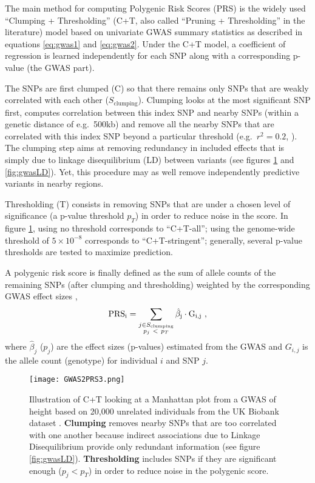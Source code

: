 The main method for computing Polygenic Risk Scores (PRS) is the widely used ``Clumping + Thresholding'' (C+T, also called ``Pruning + Thresholding'' in the literature) model based on univariate GWAS summary statistics as described in equations \eqref{eq:gwas1} and \eqref{eq:gwas2}.
Under the C+T model, a coefficient of regression is learned independently for each SNP along with a corresponding p-value (the GWAS part). 

The SNPs are first clumped (C) so that there remains only SNPs that are weakly correlated with each other ($S_\text{clumping}$). Clumping looks at the most significant SNP first, computes correlation between this index SNP and nearby SNPs (within a genetic distance of e.g.\ 500kb) and remove all the nearby SNPs that are correlated with this index SNP beyond a particular threshold (e.g.\ $r^2 = 0.2$, \cite{wray2014research}). 
The clumping step aims at removing redundancy in included effects that is simply due to linkage disequilibrium (LD) between variants (see figures \ref{fig:gwas2} and \ref{fig:gwasLD}). Yet, this procedure may as well remove independently predictive variants in nearby regions.

Thresholding (T) consists in removing SNPs that are under a chosen level of significance (a p-value threshold $p_T$) in order to reduce noise in the score.
In figure \ref{fig:gwas2}, using no threshold corresponds to ``C+T-all''; using the genome-wide threshold of $5 \times 10^{-8}$ corresponds to ``C+T-stringent''; generally, several p-value thresholds are tested to maximize prediction. 

A polygenic risk score is finally defined as the sum of allele counts of the remaining SNPs (after clumping and thresholding) weighted by the corresponding GWAS effect sizes \cite[]{purcell2009common,Dudbridge2013,wray2014research,Euesden2015},
\[\rm{PRS}_i = \sum_{\substack{j \in S_\text{clumping} \\ p_j~<~p_T}} \hat\beta_j \cdot G_{i,j}~,\] where $\hat\beta_j$ ($p_j$) are the effect sizes (p-values) estimated from the GWAS and $G_{i,j}$ is the allele count (genotype) for individual $i$ and SNP $j$.

\begin{figure}[htb]
\centerline{\texttt{[image: GWAS2PRS3.png]}}
\caption{Illustration of C+T looking at a Manhattan plot from a GWAS of height based on 20,000 unrelated individuals from the UK Biobank dataset \cite[]{bycroft2017genome}. \textbf{\color{clumping}Clumping} removes nearby SNPs that are too correlated with one another because indirect associations due to Linkage Disequilibrium provide only redundant information (see figure \ref{fig:gwasLD}). \textbf{\color{thresholding}Thresholding} includes SNPs if they are significant enough ($p_j < p_T$) in order to reduce noise in the polygenic score.}\label{fig:gwas2}
\end{figure}

